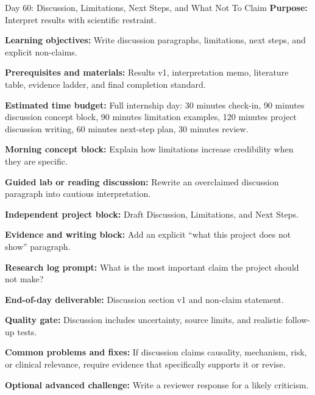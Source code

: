 \begin{dailybox}{Day 60: Discussion, Limitations, Next Steps, and What Not To Claim}
\textbf{Purpose:} Interpret results with scientific restraint.

\textbf{Learning objectives:} Write discussion paragraphs, limitations, next steps, and explicit non-claims.

\textbf{Prerequisites and materials:} Results v1, interpretation memo, literature table, evidence ladder, and final completion standard.

\textbf{Estimated time budget:} Full internship day: 30 minutes check-in, 90 minutes discussion concept block, 90 minutes limitation examples, 120 minutes project discussion writing, 60 minutes next-step plan, 30 minutes review.

\textbf{Morning concept block:} Explain how limitations increase credibility when they are specific.

\textbf{Guided lab or reading discussion:} Rewrite an overclaimed discussion paragraph into cautious interpretation.

\textbf{Independent project block:} Draft Discussion, Limitations, and Next Steps.

\textbf{Evidence and writing block:} Add an explicit ``what this project does not show'' paragraph.

\textbf{Research log prompt:} What is the most important claim the project should not make?

\textbf{End-of-day deliverable:} Discussion section v1 and non-claim statement.

\textbf{Quality gate:} Discussion includes uncertainty, source limits, and realistic follow-up tests.

\textbf{Common problems and fixes:} If discussion claims causality, mechanism, risk, or clinical relevance, require evidence that specifically supports it or revise.

\textbf{Optional advanced challenge:} Write a reviewer response for a likely criticism.
\end{dailybox}

